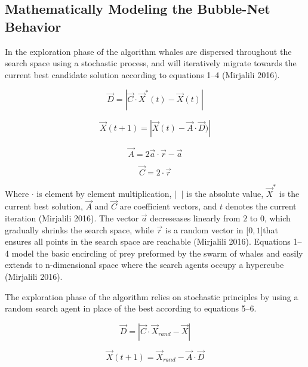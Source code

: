 \documentclass[11pt]{article}
\begin{document}
\subsection*{Mathematically Modeling the Bubble-Net Behavior} {
    In the exploration phase of the algorithm whales are dispersed throughout the search space using a stochastic process, and will iteratively migrate towards the current best candidate solution according to equations 1--4 (Mirjalili 2016).

    \begin{equation}
        \vec{D} = |\vec{C}\cdot\vec{X}^*(t) - \vec{X}(t)|
    \end{equation}

    \begin{equation}
        \vec{X}(t + 1) = |\vec{X}(t) - \vec{A}\cdot\vec{D})|
    \end{equation}

    \begin{equation}
        \vec{A} = 2\vec{a}\cdot\vec{r}-\vec{a}
    \end{equation}

    \begin{equation}
        \vec{C} = 2\cdot\vec{r}
    \end{equation}

    Where $\cdot$ is element by element multiplication, $| \;\; |$ is the absolute value, $\vec{X}^*$ is the current best solution, $\vec{A}$ and $\vec{C}$ are coefficient vectors, and $t$ denotes the current iteration (Mirjalili 2016).
    The vector $\vec{a}$ decreseases linearly from $2$ to $0$, which gradually shrinks the search space, while $\vec{r}$ is a random vector in [$0,1]$that ensures all points in the search space are reachable (Mirjalili 2016).
    Equations 1--4 model the basic encircling of prey preformed by the swarm of whales and easily extends to n-dimensional space where the search agents occupy a hypercube (Mirjalili 2016).

    The exploration phase of the algorithm relies on stochastic principles by using a random search agent in place of the best according to equations 5--6.

    \begin{equation}
        \vec{D} = |\vec{C}\cdot\vec{X}_{rand} - \vec{X}|
    \end{equation}

    \begin{equation}
        \vec{X}(t+1) = \vec{X}_{rand} - \vec{A}\cdot\vec{D}
    \end{equation}

}
\end{document}
